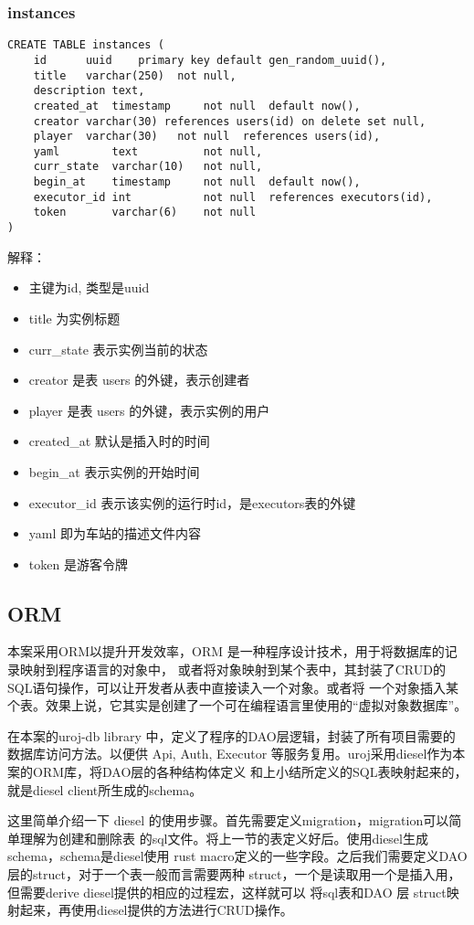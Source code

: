 \subsubsection{instances}
\begin{lstlisting}
CREATE TABLE instances (
    id      uuid    primary key default gen_random_uuid(),
    title   varchar(250)  not null,
    description text,
    created_at  timestamp     not null  default now(),
    creator varchar(30) references users(id) on delete set null,
    player  varchar(30)   not null  references users(id),    
    yaml        text          not null,
    curr_state  varchar(10)   not null,
    begin_at    timestamp     not null  default now(),
    executor_id int           not null  references executors(id),
    token       varchar(6)    not null
)
\end{lstlisting}
解释：
\begin{itemize}
    \item 主键为id, 类型是uuid
    \item title 为实例标题
    \item curr\_state 表示实例当前的状态
    \item creator 是表 users 的外键，表示创建者
    \item player 是表 users 的外键，表示实例的用户
    \item created\_at  默认是插入时的时间
    \item begin\_at 表示实例的开始时间
    \item executor\_id 表示该实例的运行时id，是executors表的外键
    \item yaml 即为车站的描述文件内容
    \item token 是游客令牌
\end{itemize}

\subsection{ORM}
本案采用ORM以提升开发效率，ORM 是一种程序设计技术，用于将数据库的记录映射到程序语言的对象中，
或者将对象映射到某个表中，其封装了CRUD的SQL语句操作，可以让开发者从表中直接读入一个对象。或者将
一个对象插入某个表。效果上说，它其实是创建了一个可在编程语言里使用的“虚拟对象数据库”。

在本案的uroj-db library 中，定义了程序的DAO层逻辑，封装了所有项目需要的数据库访问方法。以便供
Api, Auth, Executor 等服务复用。uroj采用diesel作为本案的ORM库，将DAO层的各种结构体定义
和上小结所定义的SQL表映射起来的，就是diesel client所生成的schema。

这里简单介绍一下 diesel 的使用步骤。首先需要定义migration，migration可以简单理解为创建和删除表
的sql文件。将上一节的表定义好后。使用diesel生成schema，schema是diesel使用
rust macro定义的一些字段。之后我们需要定义DAO层的struct，对于一个表一般而言需要两种
struct，一个是读取用一个是插入用，但需要derive diesel提供的相应的过程宏，这样就可以
将sql表和DAO 层 struct映射起来，再使用diesel提供的方法进行CRUD操作。